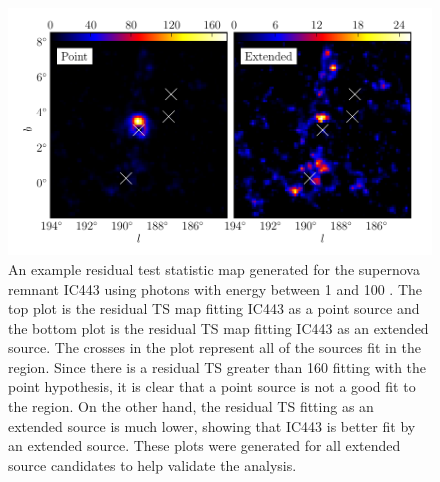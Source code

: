 \documentclass[12pt,preprint]{aastex}
\newcommand{\gev}{\text{GeV}\xspace}
\begin{document}
\begin{figure}
  \begin{center}
  \includegraphics{ic443_plots/res_tsmap_ic443.pdf}

  \caption{An example residual test statistic map generated for the
  supernova remnant IC443 using photons with energy between 1 \gev and
  100 \gev.  The top plot is the residual TS map fitting IC443
  as a point source and the bottom plot is the residual TS map fitting
  IC443 as an extended source. The crosses in the plot represent all of
  the sources fit in the region. Since there is a residual TS greater
  than 160 fitting with the point hypothesis, it is clear that a point
  source is not a good fit to the region. On the other hand,
  the residual TS fitting as an extended source is much lower, showing
  that IC443 is better fit by an extended source. These plots were generated
  for all extended source candidates to help validate the analysis.}
  \label{res_tsmaps}
  \end{center}
\end{figure}
\end{document}
